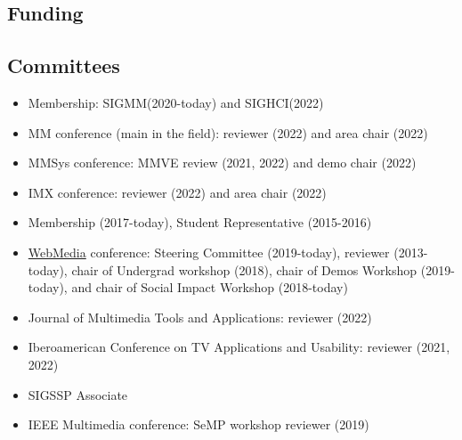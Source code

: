 \documentclass[10pt,a4paper,sans,colorlinks]{moderncv}
\begin{document}
\subsection{Funding}

\subsection{Committees}
  \begin{itemize}[mynosep]
    \item Membership: SIGMM(2020-today) and SIGHCI(2022) 
    \item MM conference (main in the field): reviewer (2022) and area chair (2022)
    \item MMSys conference: MMVE review (2021, 2022) and demo chair (2022)
    \item IMX conference: reviewer (2022) and area chair (2022)
  \end{itemize}

  \begin{itemize}[mynosep]
  \item Membership (2017-today), Student Representative (2015-2016) 
  \item\href{http://www.webmedia.org.br}{WebMedia} conference: Steering Committee (2019-today), reviewer (2013-today), \newline chair of Undergrad workshop (2018), chair of Demos Workshop (2019-today), and \newline chair of Social Impact Workshop (2018-today)
  \end{itemize}

\begin{itemize}[mynosep]
  \item Journal of Multimedia Tools and Applications: reviewer (2022)
  \item Iberoamerican Conference on TV Applications and Usability: reviewer (2021, 2022)
\end{itemize}

\begin{itemize}[mynosep]
  \item SIGSSP Associate
  \item IEEE Multimedia conference: SeMP workshop reviewer (2019)
\end{itemize}
\end{document}
